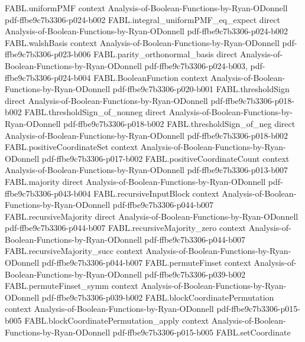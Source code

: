 \begin{theorem}
\proofstep
  {FABL.uniformPMF}
  {context}
  {Analysis-of-Boolean-Functions-by-Ryan-ODonnell}
  {pdf-ffbe9c7b3306-p024-b002}
\proofstep
  {FABL.integral_uniformPMF_eq_expect}
  {direct}
  {Analysis-of-Boolean-Functions-by-Ryan-ODonnell}
  {pdf-ffbe9c7b3306-p024-b002}
\proofstep
  {FABL.walshBasis}
  {context}
  {Analysis-of-Boolean-Functions-by-Ryan-ODonnell}
  {pdf-ffbe9c7b3306-p023-b006}
\proofstep
  {FABL.parity_orthonormal_basis}
  {direct}
  {Analysis-of-Boolean-Functions-by-Ryan-ODonnell}
  {pdf-ffbe9c7b3306-p024-b003,
    pdf-ffbe9c7b3306-p024-b004}
\proofstep
  {FABL.BooleanFunction}
  {context}
  {Analysis-of-Boolean-Functions-by-Ryan-ODonnell}
  {pdf-ffbe9c7b3306-p020-b001}
\proofstep
  {FABL.thresholdSign}
  {direct}
  {Analysis-of-Boolean-Functions-by-Ryan-ODonnell}
  {pdf-ffbe9c7b3306-p018-b002}
\proofstep
  {FABL.thresholdSign_of_nonneg}
  {direct}
  {Analysis-of-Boolean-Functions-by-Ryan-ODonnell}
  {pdf-ffbe9c7b3306-p018-b002}
\proofstep
  {FABL.thresholdSign_of_neg}
  {direct}
  {Analysis-of-Boolean-Functions-by-Ryan-ODonnell}
  {pdf-ffbe9c7b3306-p018-b002}
\proofstep
  {FABL.positiveCoordinateSet}
  {context}
  {Analysis-of-Boolean-Functions-by-Ryan-ODonnell}
  {pdf-ffbe9c7b3306-p017-b002}
\proofstep
  {FABL.positiveCoordinateCount}
  {context}
  {Analysis-of-Boolean-Functions-by-Ryan-ODonnell}
  {pdf-ffbe9c7b3306-p013-b007}
\proofstep
  {FABL.majority}
  {direct}
  {Analysis-of-Boolean-Functions-by-Ryan-ODonnell}
  {pdf-ffbe9c7b3306-p043-b004}
\proofstep
  {FABL.recursiveInputBlock}
  {context}
  {Analysis-of-Boolean-Functions-by-Ryan-ODonnell}
  {pdf-ffbe9c7b3306-p044-b007}
\proofstep
  {FABL.recursiveMajority}
  {direct}
  {Analysis-of-Boolean-Functions-by-Ryan-ODonnell}
  {pdf-ffbe9c7b3306-p044-b007}
\proofstep
  {FABL.recursiveMajority_zero}
  {context}
  {Analysis-of-Boolean-Functions-by-Ryan-ODonnell}
  {pdf-ffbe9c7b3306-p044-b007}
\proofstep
  {FABL.recursiveMajority_succ}
  {context}
  {Analysis-of-Boolean-Functions-by-Ryan-ODonnell}
  {pdf-ffbe9c7b3306-p044-b007}
\proofstep
  {FABL.permuteFinset}
  {context}
  {Analysis-of-Boolean-Functions-by-Ryan-ODonnell}
  {pdf-ffbe9c7b3306-p039-b002}
\proofstep
  {FABL.permuteFinset_symm}
  {context}
  {Analysis-of-Boolean-Functions-by-Ryan-ODonnell}
  {pdf-ffbe9c7b3306-p039-b002}
\proofstep
  {FABL.blockCoordinatePermutation}
  {context}
  {Analysis-of-Boolean-Functions-by-Ryan-ODonnell}
  {pdf-ffbe9c7b3306-p015-b005}
\proofstep
  {FABL.blockCoordinatePermutation_apply}
  {context}
  {Analysis-of-Boolean-Functions-by-Ryan-ODonnell}
  {pdf-ffbe9c7b3306-p015-b005}
\proofstep
  {FABL.setCoordinate}

\end{theorem}
